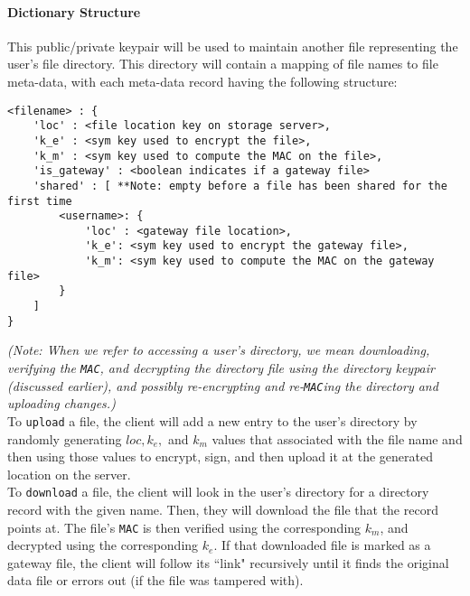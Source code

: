 \documentclass[12pt]{exam}
\begin{document}
\paragraph{Dictionary Structure} This public/private keypair will be used to maintain another file representing the user's file directory. This directory will contain a mapping of file names to file meta-data, with each meta-data record having the following structure:

\begin{verbatim}
<filename> : {
    'loc' : <file location key on storage server>,
    'k_e' : <sym key used to encrypt the file>,
    'k_m' : <sym key used to compute the MAC on the file>,
    'is_gateway' : <boolean indicates if a gateway file>
    'shared' : [ **Note: empty before a file has been shared for the first time
        <username>: {
            'loc' : <gateway file location>,
            'k_e': <sym key used to encrypt the gateway file>,
            'k_m': <sym key used to compute the MAC on the gateway file>		
        }
    ]
}
\end{verbatim}

\textit{(Note: When we refer to accessing a user's directory, we mean downloading, verifying the \texttt{MAC}, and decrypting the directory file using the directory keypair (discussed earlier), and possibly re-encrypting and re-\texttt{MAC}ing the directory and uploading changes.)}\\

To \texttt{upload} a file, the client will add a new entry to the user's directory by randomly generating $loc, k_e,$ and $k_m$ values that associated with the file name and then using those values to encrypt, sign, and then upload it at the generated location on the server.\\

To \texttt{download} a file, the client will look in the user's directory for a directory record with the given name. Then, they will download the file that the record points at. The file's \texttt{MAC} is then verified using the corresponding $k_m$, and decrypted using the corresponding $k_e$. If that downloaded file is marked as a gateway file, the client will follow its ``link" recursively until it finds the original data file or errors out (if the file was tampered with).\\
\end{document}
